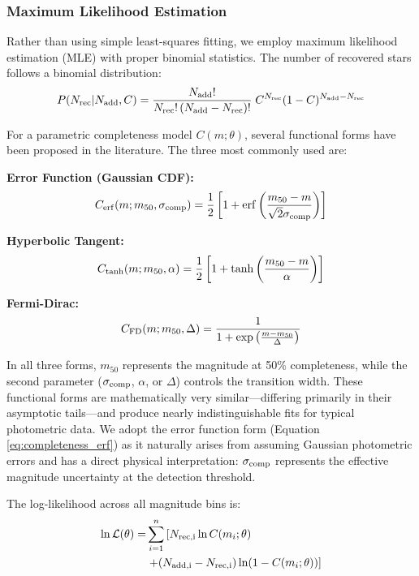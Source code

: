 \documentclass[linenumbers,trackchanges,twocolumn]{aastex701}
\begin{document}
\subsubsection{Maximum Likelihood Estimation}

Rather than using simple least-squares fitting, we employ maximum likelihood estimation (MLE) with proper binomial statistics. The number of recovered stars follows a binomial distribution:
\begin{equation}
P(N_{\rm rec} | N_{\rm add}, C) = \frac{N_{\rm add}!}{N_{\rm rec}!\,(N_{\rm add} - N_{\rm rec})!}\; C^{N_{\rm rec}} (1 - C)^{N_{\rm add} - N_{\rm rec}}
\end{equation}

For a parametric completeness model $C(m; \theta)$, several functional forms have been proposed in the literature. The three most commonly used are:

\textbf{Error Function (Gaussian CDF):}
\begin{equation}
C_{\rm erf}(m; m_{50}, \sigma_{\rm comp}) = \frac{1}{2} \left[ 1 + {\rm erf}\left( \frac{m_{50} - m}{\sqrt{2} \sigma_{\rm comp}} \right) \right]
\label{eq:completeness_erf}
\end{equation}

\textbf{Hyperbolic Tangent:}
\begin{equation}
C_{\rm tanh}(m; m_{50}, \alpha) = \frac{1}{2} \left[ 1 + \tanh\left( \frac{m_{50} - m}{\alpha} \right) \right]
\label{eq:completeness_tanh}
\end{equation}

\textbf{Fermi-Dirac:}
\begin{equation}
C_{\rm FD}(m; m_{50}, \Delta) = \frac{1}{1 + \exp\left( \frac{m - m_{50}}{\Delta} \right)}
\label{eq:completeness_fd}
\end{equation}

In all three forms, $m_{50}$ represents the magnitude at 50\% completeness, while the second parameter ($\sigma_{\rm comp}$, $\alpha$, or $\Delta$) controls the transition width. These functional forms are mathematically very similar---differing primarily in their asymptotic tails---and produce nearly indistinguishable fits for typical photometric data. We adopt the error function form (Equation \ref{eq:completeness_erf}) as it naturally arises from assuming Gaussian photometric errors and has a direct physical interpretation: $\sigma_{\rm comp}$ represents the effective magnitude uncertainty at the detection threshold.

The log-likelihood across all magnitude bins is:
\begin{align}
\ln \mathcal{L}(\theta) =& \sum_{i=1}^{n} \left[ N_{\rm rec,i} \ln C(m_i; \theta) \right. \nonumber \\
&\left. +  (N_{\rm add,i} - N_{\rm rec,i}) \ln (1 - C(m_i; \theta)) \right]
\label{eq:log_likelihood}
\end{align}
\end{document}
